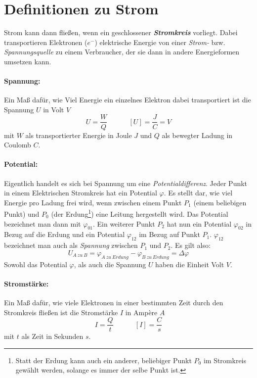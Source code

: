 		\chapter {Definitionen zu Strom}
Strom kann dann fließen, wenn ein geschlossener \textbf{\textit{Stromkreis}} vorliegt. Dabei transportieren Elektronen (\(e^{-}\)) elektrische Energie von einer \textit{Strom-} bzw. \textit{Spannungsquelle} zu einem Verbraucher, der sie dann in andere Energieformen umsetzen kann. 

\subsubsection{Spannung: } 
Ein Maß dafür, wie Viel Energie ein einzelnes Elektron dabei transportiert ist die Spannung \(U\) in Volt \(V\)
	\begin{equation}
	U = \frac{W}{Q} ~~~~~~~~~~~~~~ [U]=\frac{J}{C}=V
	\label{def_U}
	\end{equation}
mit \(W\) als transportierter Energie in Joule \(J\) und \(Q\) als bewegter Ladung in Coulomb \(C\).

\subsubsection{Potential: } Eigentlich handelt es sich bei Spannung um eine \textit{Potentialdifferenz}. Jeder Punkt in einem Elektrischen Stromkreis hat ein Potential \(\varphi\). Es stellt dar, wie viel Energie pro Ladung frei wird, wenn zwischen einem Punkt \(P_1\) (einem beliebigen Punkt) und \(P_0\) (der Erdung\footnote{Statt der Erdung kann auch ein anderer, beliebiger Punkt \(P_0\) im Stromkreis gewählt werden, solange es immer der selbe Punkt ist.}) eine Leitung hergestellt wird. Das Potential bezeichnet man dann mit \(\varphi_{01}\). Ein weiterer Punkt \(P_2\) hat nun ein Potential \(\varphi_{02}\) in Bezug auf die Erdung und ein Potential \(\varphi_{12}\) im Bezug auf Punkt \(P_1\). \(\varphi_{12}\) bezeichnet man auch als \textit{Spannung} zwischen \(P_1\) und \(P_2\). Es gilt also:
	\begin{equation}
	U_{A~zu~B} = \varphi_{A~zu~Erdung} - \varphi_{B~zu~Erdung} = \Delta\varphi
	\label{def_potential}
	\end{equation}
Sowohl das Potential \(\varphi\), als auch die Spannung \(U\) haben die Einheit Volt \(V\).

\subsubsection{Stromstärke: }
Ein Maß dafür, wie viele Elektronen in einer bestimmten Zeit durch den Stromkreis fließen ist die Stromstärke \(I\) in Ampère \(A\)
	\begin{equation}
	I = \frac{Q}{t} ~~~~~~~~~~~~~~ [I]=\frac{C}{s}
	\label{def_I}
	\end{equation}
mit \(t\) als Zeit in Sekunden \(s\).

